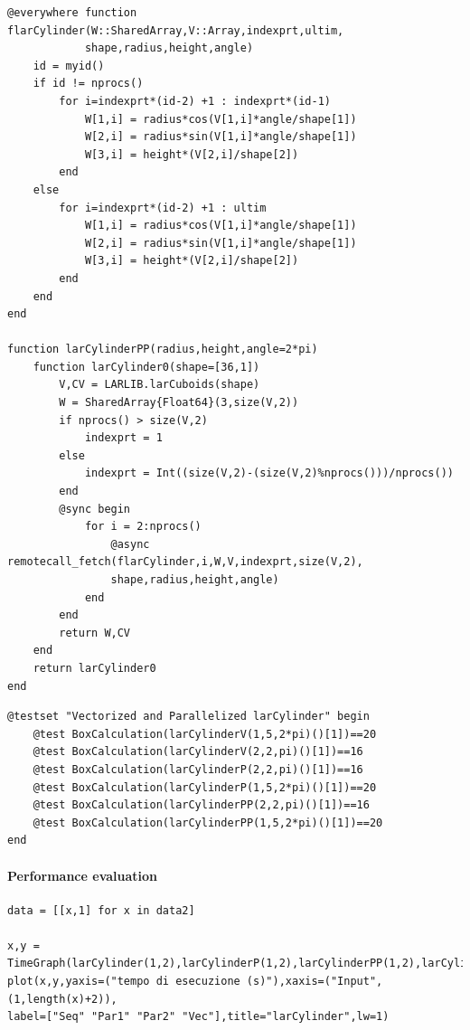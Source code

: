 \documentclass{article}
\begin{document}
\begin{Verbatim}
@everywhere function flarCylinder(W::SharedArray,V::Array,indexprt,ultim,
            shape,radius,height,angle)
    id = myid()
    if id != nprocs()
        for i=indexprt*(id-2) +1 : indexprt*(id-1)
            W[1,i] = radius*cos(V[1,i]*angle/shape[1])
            W[2,i] = radius*sin(V[1,i]*angle/shape[1])
            W[3,i] = height*(V[2,i]/shape[2]) 
        end
    else
        for i=indexprt*(id-2) +1 : ultim
            W[1,i] = radius*cos(V[1,i]*angle/shape[1])
            W[2,i] = radius*sin(V[1,i]*angle/shape[1])
            W[3,i] = height*(V[2,i]/shape[2])
        end
    end
end

function larCylinderPP(radius,height,angle=2*pi)
    function larCylinder0(shape=[36,1])
        V,CV = LARLIB.larCuboids(shape)
        W = SharedArray{Float64}(3,size(V,2))
        if nprocs() > size(V,2)
            indexprt = 1
        else
            indexprt = Int((size(V,2)-(size(V,2)%nprocs()))/nprocs())
        end
        @sync begin
            for i = 2:nprocs()
                @async remotecall_fetch(flarCylinder,i,W,V,indexprt,size(V,2),
                shape,radius,height,angle)
            end
        end
        return W,CV
    end
    return larCylinder0
end 
\end{Verbatim}

\begin{Verbatim}
@testset "Vectorized and Parallelized larCylinder" begin
    @test BoxCalculation(larCylinderV(1,5,2*pi)()[1])==20
    @test BoxCalculation(larCylinderV(2,2,pi)()[1])==16
    @test BoxCalculation(larCylinderP(2,2,pi)()[1])==16
    @test BoxCalculation(larCylinderP(1,5,2*pi)()[1])==20
    @test BoxCalculation(larCylinderPP(2,2,pi)()[1])==16
    @test BoxCalculation(larCylinderPP(1,5,2*pi)()[1])==20
end
\end{Verbatim}

\paragraph{Performance evaluation}

\begin{Verbatim}
data = [[x,1] for x in data2]

x,y = TimeGraph(larCylinder(1,2),larCylinderP(1,2),larCylinderPP(1,2),larCylinderV(1,2),data,5)
plot(x,y,yaxis=("tempo di esecuzione (s)"),xaxis=("Input",(1,length(x)+2)),
label=["Seq" "Par1" "Par2" "Vec"],title="larCylinder",lw=1) 

\end{Verbatim}
\end{document}
